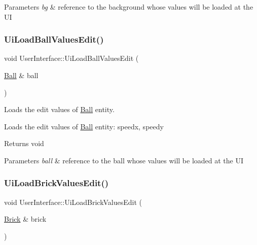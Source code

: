 \begin{DoxyParams}{Parameters}
{\em bg} & reference to the background whose values will be loaded at the UI \\
\hline
\end{DoxyParams}
\mbox{\label{class_user_interface_a94c4746d22e6b1fd0cc04a402b54db27}} 
\subsubsection{\texorpdfstring{Ui\+Load\+Ball\+Values\+Edit()}{UiLoadBallValuesEdit()}}
{\footnotesize\ttfamily void User\+Interface\+::\+Ui\+Load\+Ball\+Values\+Edit (\begin{DoxyParamCaption}\item[{\hyperlink{class_ball}{Ball} \&}]{ball }\end{DoxyParamCaption})}



Loads the edit values of \hyperlink{class_ball}{Ball} entity. 

Loads the edit values of \hyperlink{class_ball}{Ball} entity\+: speedx, speedy

\begin{DoxyReturn}{Returns}
void 
\end{DoxyReturn}

\begin{DoxyParams}{Parameters}
{\em ball} & reference to the ball whose values will be loaded at the UI \\
\hline
\end{DoxyParams}
\mbox{\label{class_user_interface_ae7c86ad6ac894f930e04bccd7da28f78}} 
\subsubsection{\texorpdfstring{Ui\+Load\+Brick\+Values\+Edit()}{UiLoadBrickValuesEdit()}}
{\footnotesize\ttfamily void User\+Interface\+::\+Ui\+Load\+Brick\+Values\+Edit (\begin{DoxyParamCaption}\item[{\hyperlink{class_brick}{Brick} \&}]{brick }\end{DoxyParamCaption})}



